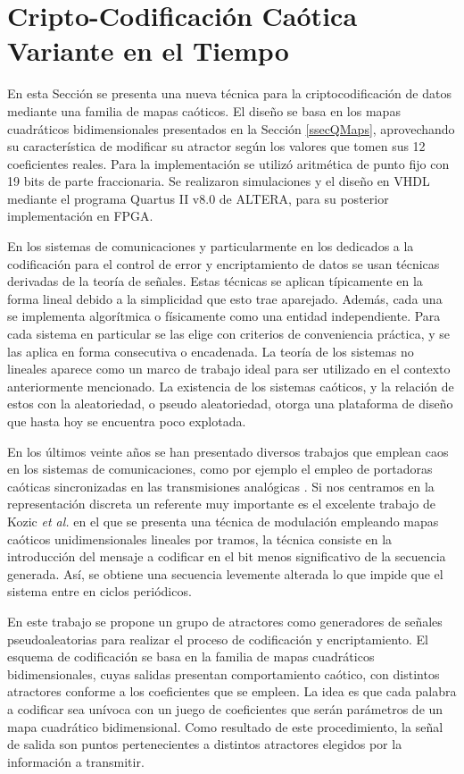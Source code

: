 \section{Cripto-Codificación Caótica Variante en el Tiempo}
\label{sec:CodCaot}

En esta Sección se presenta una nueva técnica para la criptocodificación de datos mediante una familia de mapas caóticos.
El diseño se basa en los mapas cuadráticos bidimensionales presentados en la Sección \ref{ssecQMaps}, aprovechando su característica de modificar su atractor según los valores que tomen sus 12 coeficientes reales.
Para la implementación se utilizó aritmética de punto fijo con 19 bits de parte fraccionaria.
Se realizaron simulaciones y el diseño en VHDL mediante el programa Quartus II v8.0 de ALTERA, para su posterior implementación en FPGA.

En los sistemas de comunicaciones y particularmente en los dedicados a la codificación para el control de error y encriptamiento de datos se usan técnicas derivadas de la teoría de señales.
Estas técnicas se aplican típicamente en la forma lineal debido a la simplicidad que esto trae aparejado.
Además, cada una se implementa algorítmica o físicamente como una entidad independiente.
Para cada sistema en particular se las elige con criterios de conveniencia práctica, y se las aplica en forma consecutiva o encadenada.
La teoría de los sistemas no lineales \cite{Strogatz2018,Lasota1994} aparece como un marco de trabajo ideal para ser utilizado en el contexto anteriormente mencionado.
La existencia de los sistemas caóticos, y la relación de estos con la aleatoriedad, o pseudo aleatoriedad, otorga una plataforma de diseño que hasta hoy se encuentra poco explotada.

En los últimos veinte años se han presentado diversos trabajos que emplean caos en los sistemas de comunicaciones, como por ejemplo el empleo de portadoras caóticas sincronizadas en las transmisiones analógicas \cite{Kocarev1995,Hidalgo2001}.
Si nos centramos en la representación discreta un referente muy importante es el excelente trabajo de Kozic \textit{et al.} \cite{Kozic2006A,Kozic2006B} en el que se presenta una técnica de modulación empleando mapas caóticos unidimensionales lineales por tramos, la técnica consiste en la introducción del mensaje a codificar en el bit menos significativo de la secuencia generada.
Así, se obtiene una secuencia levemente alterada lo que impide que el sistema entre en ciclos periódicos.

En este trabajo se propone un grupo de atractores como generadores de señales pseudoaleatorias para realizar el proceso de codificación y encriptamiento.
El esquema de codificación se basa en la familia de mapas cuadráticos bidimensionales, cuyas salidas presentan comportamiento caótico, con distintos atractores conforme a los coeficientes que se empleen.
La idea es que cada palabra a codificar sea unívoca con un juego de coeficientes que serán parámetros de un mapa cuadrático bidimensional.
Como resultado de este procedimiento, la señal de salida son puntos pertenecientes a distintos atractores elegidos por la información a transmitir.

